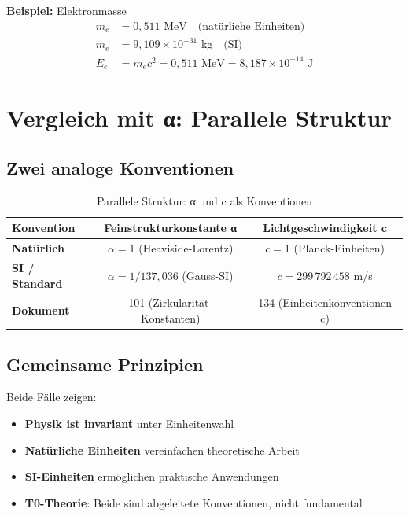 	\textbf{Beispiel:} Elektronmasse
	\begin{align}
		m_e &= 0{,}511 \text{ MeV} \quad \text{(natürliche Einheiten)} \\
		m_e &= 9{,}109 \times 10^{-31} \text{ kg} \quad \text{(SI)} \\
		E_e &= m_e c^2 = 0{,}511 \text{ MeV} = 8{,}187 \times 10^{-14} \text{ J}
	\end{align}
	
	\section{Vergleich mit α: Parallele Struktur}
	
	\subsection{Zwei analoge Konventionen}
	
	\begin{table}[h]
		\centering
		\begin{tabular}{|l|c|c|}
			\hline
			\textbf{Konvention} & \textbf{Feinstrukturkonstante α} & \textbf{Lichtgeschwindigkeit c} \\
			\hline
			\textbf{Natürlich} & $\alpha = 1$ (Heaviside-Lorentz) & $c = 1$ (Planck-Einheiten) \\
			\textbf{SI / Standard} & $\alpha = 1/137{,}036$ (Gauss-SI) & $c = 299\,792\,458$ m/s \\
			\hline
			\textbf{Dokument} & 101 (Zirkularität-Konstanten) & 134 (Einheitenkonventionen c) \\
			\hline
		\end{tabular}
		\caption{Parallele Struktur: α und c als Konventionen}
	\end{table}
	
	\subsection{Gemeinsame Prinzipien}
	
	Beide Fälle zeigen:
	\begin{itemize}
		\item \textbf{Physik ist invariant} unter Einheitenwahl
		\item \textbf{Natürliche Einheiten} vereinfachen theoretische Arbeit
		\item \textbf{SI-Einheiten} ermöglichen praktische Anwendungen
		\item \textbf{T0-Theorie}: Beide sind abgeleitete Konventionen, nicht fundamental
	\end{itemize}
	
